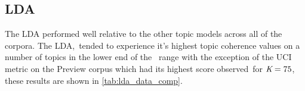\documentclass[letterpaper,12pt]{article}
\begin{document}

\newpage

\subsection{LDA}
The LDA performed well relative to the other topic models across all of the corpora. The LDA,\
tended to experience it's highest topic coherence values on a number of topics in the lower end of the \
range with the exception of the UCI metric on the Preview corpus which had its highest score observed\
for $\emph{K} = 75$, these results are shown in \ref{tab:lda_data_comp}.
\end{document}
